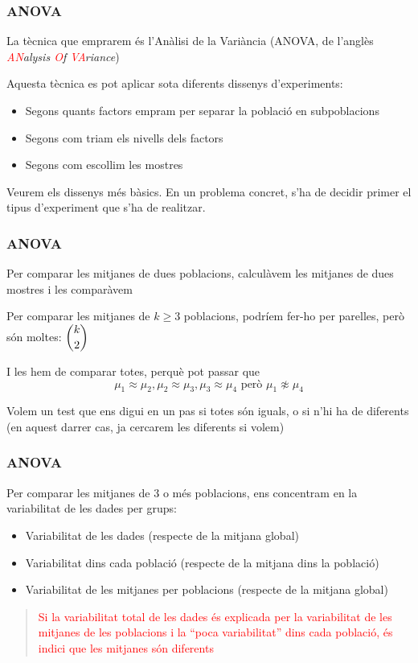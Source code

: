 \documentclass[12pt,t]{beamer}
\newcommand{\red}[1]{\textcolor{red}{#1}}
\renewcommand{\emph}[1]{{\color{red}#1}}
\renewcommand{\geq}{\geqslant}
\theoremstyle{plain}
\theoremstyle{definition}
\begin{document}
\begin{frame}
\frametitle{ANOVA}
La tècnica que emprarem és l'\emph{Anàlisi de la Variància} (\emph{ANOVA}, de l'anglès \textsl{\red{AN}alysis \red{O}f \red{VA}riance})
\bigskip

Aquesta tècnica es pot aplicar sota diferents dissenys d'experiments:
\begin{itemize}
\item Segons quants factors empram per separar la població en subpoblacions
\medskip

\item Segons com triam els nivells dels factors
\medskip

\item Segons com escollim les mostres
\end{itemize}
\medskip

Veurem els dissenys més bàsics. En un problema concret, s'ha de decidir primer el tipus d'experiment que s'ha de realitzar.

\end{frame}



\begin{frame}
\frametitle{ANOVA}

Per comparar les mitjanes de dues poblacions,  calculàvem les mitjanes de dues mostres i les comparàvem
\medskip

Per comparar les mitjanes de $k\geq 3$ poblacions, podríem fer-ho per parelles, però són moltes: $\dbinom{k}{2}$
\medskip

I les hem de comparar totes, perquè pot passar que
$$
\mu_1\approx \mu_2, \mu_2\approx \mu_3, \mu_3\approx\mu_4\mbox{ però }
\mu_1\not\approx \mu_4
$$
\smallskip

Volem un test que ens digui en un pas si totes són iguals, o si n'hi ha de diferents (en aquest darrer cas, ja cercarem les diferents si volem)
\end{frame}


\begin{frame}
\frametitle{ANOVA}

Per comparar les mitjanes de 3 o més poblacions, ens concentram en la variabilitat de les dades per grups:
\medskip

\begin{itemize}
\item Variabilitat de les dades (respecte de la mitjana global)
\medskip

\item Variabilitat dins cada població (respecte de la mitjana dins la població)
\medskip

\item Variabilitat de les mitjanes per poblacions (respecte de la mitjana global)
\medskip
\end{itemize}

\begin{quote}
\red{Si la variabilitat total de les dades és explicada per la variabilitat de les mitjanes de les poblacions i  la ``poca variabilitat'' dins cada població, és indici que les mitjanes són diferents}
\end{quote}
\end{frame}
\end{document}
